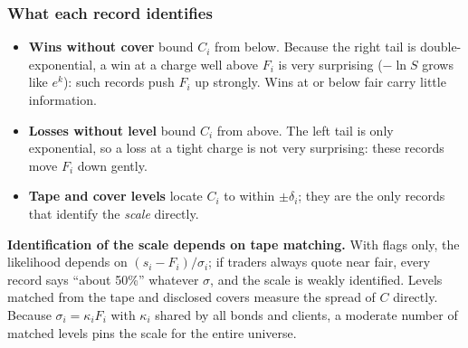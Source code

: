 \documentclass[11pt,a4paper]{article}
\theoremstyle{definition}
\theoremstyle{remark}
\begin{document}
\subsubsection{What each record identifies}
\begin{itemize}[itemsep=2pt]
\item \textbf{Wins without cover} bound $C_i$ from below. Because the right tail is double-exponential, a win at a charge well above $F_i$ is very surprising ($-\ln S$ grows like $e^{k}$): such records push $F_i$ up strongly. Wins at or below fair carry little information.
\item \textbf{Losses without level} bound $C_i$ from above. The left tail is only exponential, so a loss at a tight charge is not very surprising: these records move $F_i$ down gently.
\item \textbf{Tape and cover levels} locate $C_i$ to within $\pm\delta_i$; they are the only records that identify the \emph{scale} directly.
\end{itemize}
\begin{decision}
\textbf{Identification of the scale depends on tape matching.} With flags only, the likelihood depends on $(s_i-F_i)/\sigma_i$; if traders always quote near fair, every record says ``about 50\%'' whatever $\sigma$, and the scale is weakly identified. Levels matched from the tape and disclosed covers measure the spread of $C$ directly. Because $\sigma_i=\kappa_iF_i$ with $\kappa_i$ shared by all bonds and clients, a moderate number of matched levels pins the scale for the entire universe.
\end{decision}
\end{document}
